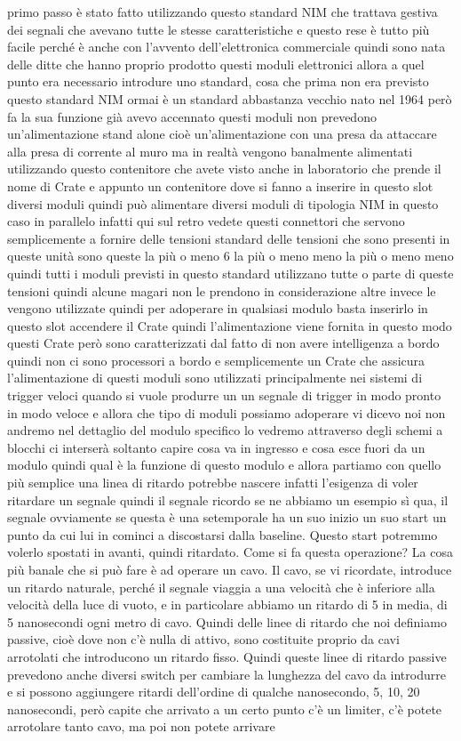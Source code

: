 primo passo è stato fatto utilizzando questo standard NIM che trattava gestiva dei segnali che avevano tutte le stesse caratteristiche e questo rese è tutto più facile perché è anche con l'avvento dell'elettronica commerciale quindi sono nata delle ditte che hanno proprio prodotto questi moduli elettronici allora a quel punto era necessario introdure uno standard, cosa che prima non era previsto questo standard NIM ormai è un standard abbastanza vecchio nato nel 1964 però fa la sua funzione già avevo accennato questi moduli non prevedono un'alimentazione stand alone cioè un'alimentazione con una presa da attaccare alla presa di corrente al muro ma in realtà vengono banalmente alimentati utilizzando questo contenitore che avete visto anche in laboratorio che prende il nome di Crate e appunto un contenitore dove si fanno a inserire in questo slot diversi moduli quindi può alimentare diversi moduli di tipologia NIM in questo caso in parallelo infatti qui sul retro vedete questi connettori che servono semplicemente a fornire delle tensioni standard delle tensioni che sono presenti in queste unità sono queste la più o meno 6 la più o meno meno la più o meno meno quindi tutti i moduli previsti in questo standard utilizzano tutte o parte di queste tensioni quindi alcune magari non le prendono in considerazione altre invece le vengono utilizzate quindi per adoperare in qualsiasi modulo basta inserirlo in questo slot accendere il Crate quindi l'alimentazione viene fornita in questo modo questi Crate però sono caratterizzati dal fatto di non avere intelligenza a bordo quindi non ci sono processori a bordo e semplicemente un Crate che assicura l'alimentazione di questi moduli sono utilizzati principalmente nei sistemi di trigger veloci quando si vuole produrre un un segnale di trigger in modo pronto in modo veloce e allora che tipo di moduli possiamo adoperare vi dicevo noi non andremo nel dettaglio del modulo specifico lo vedremo attraverso degli schemi a blocchi ci interserà soltanto capire cosa va in ingresso e cosa esce fuori da un modulo quindi qual è la funzione di questo modulo e allora partiamo con quello più semplice una linea di ritardo potrebbe nascere infatti l'esigenza di voler ritardare un segnale quindi il segnale ricordo se ne abbiamo un esempio sì qua, il segnale ovviamente se questa è una setemporale ha un suo inizio un suo start un punto da cui lui in cominci a discostarsi dalla baseline. Questo start potremmo volerlo spostati in avanti, quindi ritardato. Come si fa questa operazione? La cosa più banale che si può fare è ad operare un cavo. Il cavo, se vi ricordate, introduce un ritardo naturale, perché il segnale viaggia a una velocità che è inferiore alla velocità della luce di vuoto, e in particolare abbiamo un ritardo di 5 in media, di 5 nanosecondi ogni metro di cavo. Quindi delle linee di ritardo che noi definiamo passive, cioè dove non c'è nulla di attivo, sono costituite proprio da cavi arrotolati che introducono un ritardo fisso. Quindi queste linee di ritardo passive prevedono anche diversi switch per cambiare la lunghezza del cavo da introdurre e si possono aggiungere ritardi dell'ordine di qualche nanosecondo, 5, 10, 20 nanosecondi, però capite che arrivato a un certo punto c'è un limiter, c'è potete arrotolare tanto cavo, ma poi non potete arrivare 
